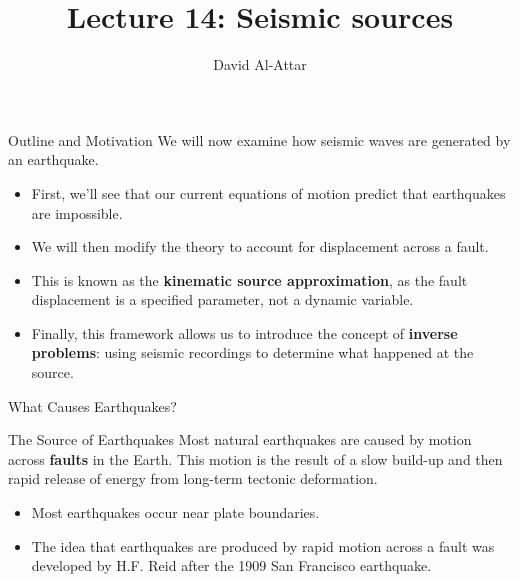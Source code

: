 \documentclass{beamer}
\title[Lecture 14: Seismic sources]{Lecture 14: Seismic sources}
\author{David Al-Attar}
\institute{Michaelmas term 2024}
\date{}
\begin{document}

\begin{frame}
    \titlepage
\end{frame}

\begin{frame}{Outline and Motivation}
    We will now examine how seismic waves are generated by an earthquake.
    \begin{itemize}
        \item First, we'll see that our current equations of motion predict that earthquakes are impossible.
        \pause
        \item We will then modify the theory to account for displacement across a fault.
        \pause
        \item This is known as the \textbf{kinematic source approximation}, as the fault displacement is a specified parameter, not a dynamic variable.
        \pause
        \item Finally, this framework allows us to introduce the concept of \textbf{inverse problems}: using seismic recordings to determine what happened at the source.
    \end{itemize}
\end{frame}


\begin{frame}{What Causes Earthquakes?}
    \begin{block}{The Source of Earthquakes}
        Most natural earthquakes are caused by motion across \textbf{faults} in the Earth. This motion is the result of a slow build-up and then rapid release of energy from long-term tectonic deformation.
    \end{block}
    \pause
    \begin{itemize}
        \item Most earthquakes occur near plate boundaries.
        \pause
        \item The idea that earthquakes are produced by rapid motion across a fault was developed by H.F. Reid after the 1909 San Francisco earthquake.
    \end{itemize}
\end{frame}
\end{document}

